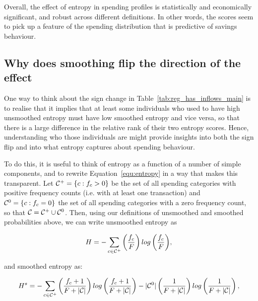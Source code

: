 Overall, the effect of entropy in spending profiles is statistically and
economically significant, and robust across different definitions. In other
words, the scores seem to pick up a feature of the spending distribution that
is predictive of savings behaviour.



\subsection{Why does smoothing flip the direction of the effect}%
\label{sub:why_does_smoothing_flip_the_direction_of_the_effect}

One way to think about the sign change in Table~\ref{tab:reg_has_inflows_main}
is to realise that it implies that at least some individuals who used to have
high unsmoothed entropy must have low smoothed entropy and vice versa, so that
there is a large difference in the relative rank of their two entropy scores.
Hence, understanding who those individuals are might provide insights into both
the sign flip and into what entropy captures about spending behaviour.

To do this, it is useful to think of entropy as a function of a number of
simple components, and to rewrite Equation~\ref{equ:entropy} in a way that
makes this transparent. Let $\mathcal{C}^{+} = \{c: f_c > 0\}$ be the set of all
spending categories with positive frequency counts (i.e.  with at least one
transaction) and $\mathcal{C}^{0} = \{c: f_c = 0\}$ the set of all spending categories
with a zero frequency count, so that $\mathcal{C} = \mathcal{C}^{+} \cup \mathcal{C}^{0}$. Then, using
our definitions of unsmoothed and smoothed probabilities above, we can write
unsmoothed entropy as

\begin{equation}
\label{equ:entropy_us}
H = -\sum_{c \in \mathcal{C}^{+}}{\left(\frac{f_c}{F}\right)
log\left(\frac{f_c}{F}\right)},
\end{equation}

and smoothed entropy as:

\begin{equation}
\label{equ:entropy_s}
H^s = -\sum_{c \in \mathcal{C}^{+}}{\left(\frac{f_c + 1}{F + |\mathcal{C}|}\right)
log\left(\frac{f_c + 1}{F + |\mathcal{C}|}\right)}
- |\mathcal{C}^{0}|\left(\frac{1}{F + |\mathcal{C}|}\right)
log\left(\frac{1}{F + |\mathcal{C}|}\right),
\end{equation}

